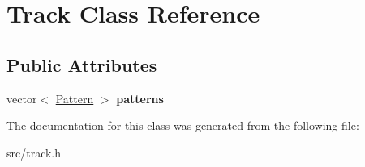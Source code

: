 \hypertarget{class_track}{}\section{Track Class Reference}
\label{class_track}
\subsection*{Public Attributes}
\begin{DoxyCompactItemize}
\item 
vector$<$ \hyperlink{class_pattern}{Pattern} $>$ {\bfseries patterns}\hypertarget{class_track_a992efdf01d78c8bf1fe2313ae41b6823}{}\label{class_track_a992efdf01d78c8bf1fe2313ae41b6823}

\end{DoxyCompactItemize}


The documentation for this class was generated from the following file\+:\begin{DoxyCompactItemize}
\item 
src/track.\+h\end{DoxyCompactItemize}
